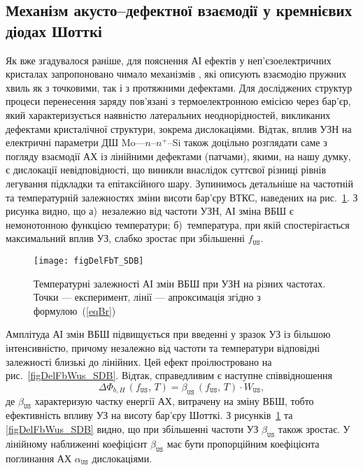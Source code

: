 \subsection{Механізм акусто--дефектної взаємодії у кремнієвих діодах Шотткі}

Як вже згадувалося раніше, для пояснення АІ ефектів у неп'єзоелектричних кристалах
запропоновано чимало механізмів \cite{Pavlovich,Korotchenkov1995,MirzadeJAP2011,PELESHCHAK:UPJ2016,Krevchik,MirzadeJAP2005,Davletova2008,OstrovKor92},
які описують взаємодію пружних хвиль як з точковими, так і з протяжними дефектами.
Для досліджених структур процеси перенесення заряду пов'язані з термоелектронною емісією
через бар'єр, який характеризується наявністю латеральних неоднорідностей, викликаних дефектами
кристалічної структури, зокрема дислокаціями.
Відтак, вплив УЗН на електричні параметри ДШ Mo---$n$--$n^+$--Si також доцільно розглядати саме з погляду
взаємодії АХ із лінійними дефектами (патчами), якими, на нашу думку, є дислокації невідповідності, що
виникли внаслідок суттєвої різниці рівнів легування підкладки та епітаксійного шару.
Зупинимось детальніше на частотній та температурній залежностях зміни висоти бар'єру ВТКС,
наведених на рис.~\ref{figDelFbT_SDB}.
З рисунка видно, що
а)~незалежно від частоти УЗН, АІ зміна ВБШ є немонотонною функцією температури;
б)~температура, при якій спостерігається максимальний вплив УЗ, слабко зростає при збільшенні $f_\mathtt{US}$.

\begin{figure}
\center
\texttt{[image: figDelFbT\_SDB]}
\caption{\label{figDelFbT_SDB}
Температурні залежності АІ змін ВБШ при УЗН на різних частотах.
Точки --- експеримент,
лінії --- апроксимація згідно з формулою~(\ref{eqBr})
}%
\end{figure}

Амплітуда АІ змін ВБШ підвищується при введенні у зразок УЗ із більшою інтенсивністю, причому незалежно від частоти та температури
відповідні залежності близькі до лінійних.
Цей ефект проілюстровано на рис.~\ref{figDelFbWus_SDB}.
Відтак, справедливим є наступне співвідношення
\begin{equation}
\label{eqBt}
\Delta\Phi_{b,H}\,(f_\mathtt{US},\,T)=\beta_\mathtt{US}\,(f_\mathtt{US},\,T)\cdot W_\mathtt{US},
\end{equation}
де
$\beta_\mathtt{US}$ характеризую частку енергії АХ, витрачену на зміну ВБШ, тобто
ефективність впливу УЗ на висоту бар'єру Шотткі.
З рисунків~\ref{figDelFbT_SDB} та \ref{figDelFbWus_SDB} видно, що при збільшенні частоти УЗ $\beta_\mathtt{US}$ також зростає.
У лінійному наближенні коефіцієнт $\beta_\mathtt{US}$ має бути пропорційним коефіцієнта поглинання АХ $\alpha_\mathtt{US}$ дислокаціями.


